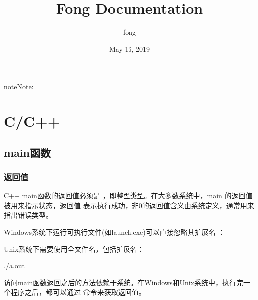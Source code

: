 \documentclass[letterpaper,10pt,english]{sphinxmanual}
\title{Fong Documentation}
\date{May 16, 2019}
\author{fong}
\begin{document}
\maketitle
\sphinxtableofcontents
{}\label{\detokenize{index::doc}}


\begin{sphinxadmonition}{note}{Note:}


\end{sphinxadmonition}


\chapter{C/C++}
\label{\detokenize{cpp/index:c-c}}\label{\detokenize{cpp/index::doc}}\label{\detokenize{cpp/index:id1}}

\section{main函数}
\label{\detokenize{cpp/01_main:main}}\label{\detokenize{cpp/01_main::doc}}

\subsection{返回值}
\label{\detokenize{cpp/01_main:id1}}
C++ main函数的返回值必须是  ，即整型类型。在大多数系统中，main 的返回值被用来指示状态，返回值  表示执行成功，非0的返回值含义由系统定义，通常用来指出错误类型。

Windows系统下运行可执行文件(如launch.exe)可以直接忽略其扩展名  ：

%
\begin{sphinxVerbatim}[commandchars=\\\{\}]
\end{sphinxVerbatim}

Unix系统下需要使用全文件名，包括扩展名：

%
\begin{sphinxVerbatim}[commandchars=\\\{\}]
./a.out
\end{sphinxVerbatim}

访问main函数返回之后的方法依赖于系统。在Windows和Unix系统中，执行完一个程序之后，都可以通过  命令来获取返回值。
\end{document}
